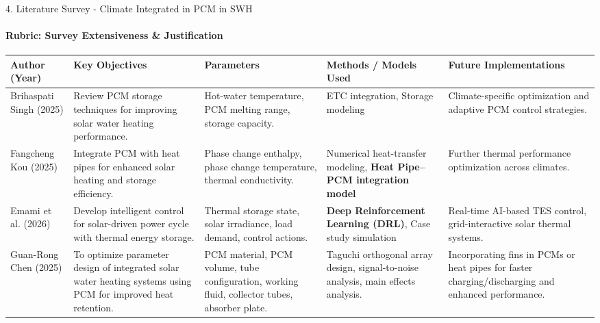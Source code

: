 \documentclass[aspectratio=169, 11pt]{beamer}
\begin{document}
\begin{frame}{4. Literature Survey - Climate Integrated in PCM in SWH}
\framesubtitle{Rubric: Survey Extensiveness \& Justification}
\tiny
\renewcommand{\arraystretch}{1.5}
\begin{table}
\centering
\begin{tabular}{|p{1.6cm}|p{3.0cm}|p{2.8cm}|p{3.0cm}|p{3.0cm}|}
\hline
\textbf{Author (Year)} &
\textbf{Key Objectives} &
\textbf{Parameters} &
\textbf{Methods / Models Used} &
\textbf{Future Implementations} \\
\hline
Brihaspati Singh (2025) \cite{Singh2025PCMSWH} &
Review PCM storage techniques for improving solar water heating performance. &
Hot-water temperature, PCM melting range, storage capacity. &
ETC integration, Storage modeling &
Climate-specific optimization and adaptive PCM control strategies. \\
\hline
Fangcheng Kou (2025) \cite{Kou2025BIHPPCM} &
Integrate PCM with heat pipes for enhanced solar heating and storage efficiency. &
Phase change enthalpy, phase change temperature, thermal conductivity. &
Numerical heat-transfer modeling, \textbf{Heat Pipe--PCM integration model} &
Further thermal performance optimization across climates. \\
\hline
Emami et al. (2026) \cite{Emami2026DRLSolar} &
Develop intelligent control for solar-driven power cycle with thermal energy storage. &
Thermal storage state, solar irradiance, load demand, control actions. &
\textbf{Deep Reinforcement Learning (DRL)}, Case study simulation &
Real-time AI-based TES control, grid-interactive solar thermal systems. \\
\hline
Guan-Rong Chen (2025) \cite{Chen2025TaguchiPCM} &
To optimize parameter design of integrated solar water heating systems using PCM for improved heat retention. &
PCM material, PCM volume, tube configuration, working fluid, collector tubes, absorber plate. &
Taguchi orthogonal array design, signal-to-noise analysis, main effects analysis. &
Incorporating fins in PCMs or heat pipes for faster charging/discharging and enhanced performance. \\
\hline
\end{tabular}
\end{table}
\end{frame}
\end{document}
